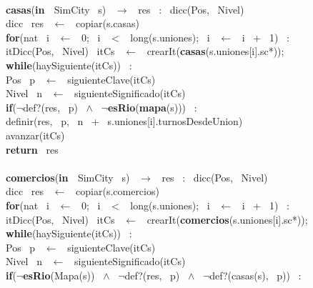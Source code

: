 \noindent\makebox[\linewidth]{\rule{\textwidth}{0.4pt}}
\\
\noindent\makebox[\linewidth]{\rule{\textwidth}{0.4pt}}
\textbf{casas}(\textbf{in \ }SimCity \ s) \ $\rightarrow $ \ res \ : \ dicc(Pos, \ Nivel)\\
\indent dicc \ res \ $\leftarrow$ \ copiar(s.casas)\\
\indent \textbf{for}(nat \ i \ $\leftarrow$ \ 0; \ i \ $<$ \ long(s.uniones); \ i \ $\leftarrow$ \ i \ + \ 1) \ : \ \\
\indent \indent itDicc(Pos, \ Nivel) \ itCs \ $\leftarrow$ \ crearIt(\textbf{casas}(s.uniones[i].sc*));\\
\indent \indent \textbf{while}(haySiguiente(itCs)) \ :\\
\indent \indent \indent Pos \ p \ $\leftarrow$ \ siguienteClave(itCs)\\
\indent \indent \indent Nivel \ n \ $\leftarrow$ \ siguienteSignificado(itCs)\\
\indent \indent \indent \textbf{if}($\neg$def?(res, \ p) \ $\wedge$ \ $\neg$\textbf{esRio}(\textbf{mapa}(s))) \ :\\
\indent \indent \indent \indent definir(res, \ p, \ n \ + \ s.uniones[i].turnosDesdeUnion)\\
\indent \indent \indent avanzar(itCs)\\
\indent \textbf{return} \ res\\
\noindent\makebox[\linewidth]{\rule{\textwidth}{0.4pt}}
\\
\noindent\makebox[\linewidth]{\rule{\textwidth}{0.4pt}}
\textbf{comercios}(\textbf{in \ }SimCity \ s) \ $\rightarrow $ \ res \ : \ dicc(Pos, \ Nivel)\\
\indent dicc \ res \ $\leftarrow$ \ copiar(s.comercios)\\
\indent \textbf{for}(nat \ i \ $\leftarrow$ \ 0; \ i \ $<$ \ long(s.uniones); \ i \ $\leftarrow$ \ i \ + \ 1) \ : \ \\
\indent \indent itDicc(Pos, \ Nivel) \ itCs \ $\leftarrow$ \ crearIt(\textbf{comercios}(s.uniones[i].sc*));\\
\indent \indent \textbf{while}(haySiguiente(itCs)) \ :\\
\indent \indent \indent Pos \ p \ $\leftarrow$ \ siguienteClave(itCs)\\
\indent \indent \indent Nivel \ n \ $\leftarrow$ \ siguienteSignificado(itCs)\\
\indent \indent \indent \textbf{if}($\neg$\textbf{esRio}(Mapa(s)) \ $\wedge$ \ $\neg$def?(res, \ p) \ $\wedge$ \ $\neg$def?(casas(s), \ p)) \ :\\

